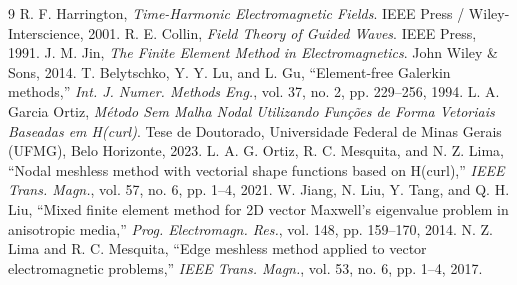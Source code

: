\documentclass[11pt,a4paper]{article}
\begin{document}
\begin{thebibliography}{9}
 R. F. Harrington, \textit{Time-Harmonic Electromagnetic Fields}. IEEE Press / Wiley-Interscience, 2001.
 R. E. Collin, \textit{Field Theory of Guided Waves}. IEEE Press, 1991.
 J. M. Jin, \textit{The Finite Element Method in Electromagnetics}. John Wiley \& Sons, 2014.
 T. Belytschko, Y. Y. Lu, and L. Gu, ``Element-free Galerkin methods,'' \textit{Int. J. Numer. Methods Eng.}, vol. 37, no. 2, pp. 229--256, 1994.
 L. A. Garcia Ortiz, \textit{M\'etodo Sem Malha Nodal Utilizando Fun\c{c}\~oes de Forma Vetoriais Baseadas em H(curl)}. Tese de Doutorado, Universidade Federal de Minas Gerais (UFMG), Belo Horizonte, 2023.
 L. A. G. Ortiz, R. C. Mesquita, and N. Z. Lima, ``Nodal meshless method with vectorial shape functions based on H(curl),'' \textit{IEEE Trans. Magn.}, vol. 57, no. 6, pp. 1--4, 2021.
 W. Jiang, N. Liu, Y. Tang, and Q. H. Liu, ``Mixed finite element method for 2D vector Maxwell's eigenvalue problem in anisotropic media,'' \textit{Prog. Electromagn. Res.}, vol. 148, pp. 159--170, 2014.
 N. Z. Lima and R. C. Mesquita, ``Edge meshless method applied to vector electromagnetic problems,'' \textit{IEEE Trans. Magn.}, vol. 53, no. 6, pp. 1--4, 2017.
\end{thebibliography}
\end{document}
